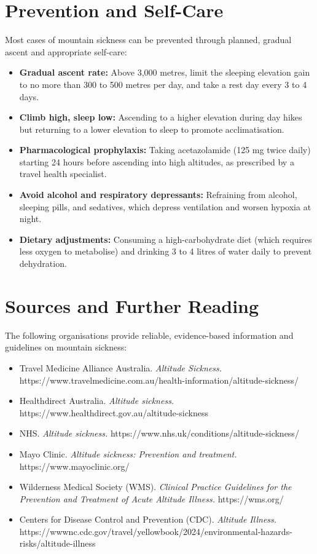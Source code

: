 \section*{Prevention and Self-Care}
Most cases of mountain sickness can be prevented through planned, gradual ascent and appropriate self-care:
\begin{itemize}
    \item \textbf{Gradual ascent rate:} Above 3,000 metres, limit the sleeping elevation gain to no more than 300 to 500 metres per day, and take a rest day every 3 to 4 days.
    \item \textbf{Climb high, sleep low:} Ascending to a higher elevation during day hikes but returning to a lower elevation to sleep to promote acclimatisation.
    \item \textbf{Pharmacological prophylaxis:} Taking acetazolamide (125 mg twice daily) starting 24 hours before ascending into high altitudes, as prescribed by a travel health specialist.
    \item \textbf{Avoid alcohol and respiratory depressants:} Refraining from alcohol, sleeping pills, and sedatives, which depress ventilation and worsen hypoxia at night.
    \item \textbf{Dietary adjustments:} Consuming a high-carbohydrate diet (which requires less oxygen to metabolise) and drinking 3 to 4 litres of water daily to prevent dehydration.
\end{itemize}

\section*{Sources and Further Reading}
The following organisations provide reliable, evidence-based information and guidelines on mountain sickness:
\begin{itemize}
    \item Travel Medicine Alliance Australia. \textit{Altitude Sickness.} https://www.travelmedicine.com.au/health-information/altitude-sickness/
    \item Healthdirect Australia. \textit{Altitude sickness.} https://www.healthdirect.gov.au/altitude-sickness
    \item NHS. \textit{Altitude sickness.} https://www.nhs.uk/conditions/altitude-sickness/
    \item Mayo Clinic. \textit{Altitude sickness: Prevention and treatment.} https://www.mayoclinic.org/
    \item Wilderness Medical Society (WMS). \textit{Clinical Practice Guidelines for the Prevention and Treatment of Acute Altitude Illness.} https://wms.org/
    \item Centers for Disease Control and Prevention (CDC). \textit{Altitude Illness.} https://wwwnc.cdc.gov/travel/yellowbook/2024/environmental-hazards-risks/altitude-illness
\end{itemize}
